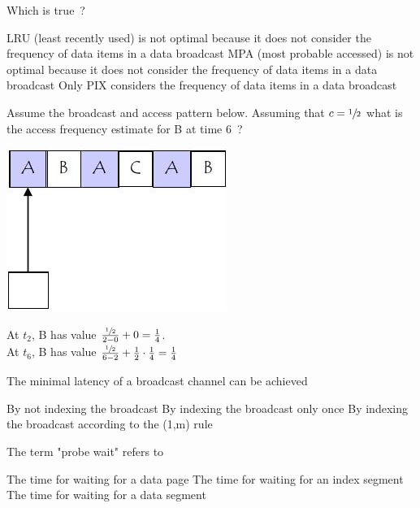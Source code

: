 \documentclass[12pt,a4paper]{exam} %
\begin{document}
\begin{flushleft}
\begin{multicols*}{2}
\begin{questions}
\question Which is true~?
\begin{checkboxes}
\CorrectChoice LRU (least recently used) is not optimal because it does not consider the frequency of data items in a data broadcast
\CorrectChoice MPA (most probable accessed) is not optimal because it does not consider the frequency of data items in a data broadcast
\CorrectChoice Only PIX considers the frequency of data items in a data broadcast
\end{checkboxes}

\question Assume the broadcast and access pattern below. Assuming that $c=\sfrac{1}{2}$ what is the access frequency estimate for B at time 6~?
\begin{colfig}
\centering
\includegraphics[scale=0.75]{w9_s49}
\end{colfig}
\begin{checkboxes}
\choice {}
\CorrectChoice {}
\choice {}
\choice {}
\end{checkboxes}
\begin{solution}

At $t_2$, B has value $\frac{\sfrac{1}{2}}{2-0}+0 = \frac{1}{4}$.\\
At $t_6$, B has value $\frac{\sfrac{1}{2}}{6-2}+\frac{1}{2}\cdot\frac{1}{4} = \frac{1}{4}$
\end{solution}

\question The minimal latency of a broadcast channel can be achieved
\begin{checkboxes}
\CorrectChoice By not indexing the broadcast
\choice By indexing the broadcast only once
\choice By indexing the broadcast according to the (1,m) rule
\end{checkboxes}

\question The term "probe wait" refers to
\begin{checkboxes}
\choice The time for waiting for a data page
\CorrectChoice The time for waiting for an index segment
\choice The time for waiting for a data segment
\end{checkboxes}


\end{questions}
\end{multicols*}
\end{flushleft}
\end{document}
